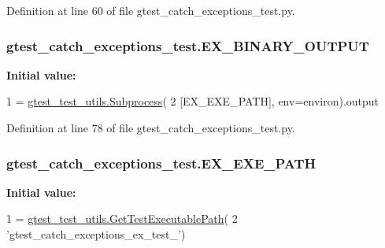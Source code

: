 Definition at line 60 of file gtest\+\_\+catch\+\_\+exceptions\+\_\+test.\+py.

\subsubsection[{\texorpdfstring{E\+X\+\_\+\+B\+I\+N\+A\+R\+Y\+\_\+\+O\+U\+T\+P\+UT}{EX_BINARY_OUTPUT}}]{\setlength{\rightskip}{0pt plus 5cm}gtest\+\_\+catch\+\_\+exceptions\+\_\+test.\+E\+X\+\_\+\+B\+I\+N\+A\+R\+Y\+\_\+\+O\+U\+T\+P\+UT}\hypertarget{namespacegtest__catch__exceptions__test_a012f2b0e05fd56aa6817595da940c891}{}\label{namespacegtest__catch__exceptions__test_a012f2b0e05fd56aa6817595da940c891}
{\bfseries Initial value\+:}
\begin{DoxyCode}
1 = \hyperlink{classgtest__test__utils_1_1_subprocess}{gtest\_test\_utils.Subprocess}(
2     [EX\_EXE\_PATH], env=environ).output
\end{DoxyCode}


Definition at line 78 of file gtest\+\_\+catch\+\_\+exceptions\+\_\+test.\+py.

\subsubsection[{\texorpdfstring{E\+X\+\_\+\+E\+X\+E\+\_\+\+P\+A\+TH}{EX_EXE_PATH}}]{\setlength{\rightskip}{0pt plus 5cm}gtest\+\_\+catch\+\_\+exceptions\+\_\+test.\+E\+X\+\_\+\+E\+X\+E\+\_\+\+P\+A\+TH}\hypertarget{namespacegtest__catch__exceptions__test_a2154a0f0c4c506089d686c1365d288be}{}\label{namespacegtest__catch__exceptions__test_a2154a0f0c4c506089d686c1365d288be}
{\bfseries Initial value\+:}
\begin{DoxyCode}
1 = \hyperlink{namespacegtest__test__utils_a89ed3717984a80ffbb7a9c92f71b86a2}{gtest\_test\_utils.GetTestExecutablePath}(
2     \textcolor{stringliteral}{'gtest\_catch\_exceptions\_ex\_test\_'})
\end{DoxyCode}


